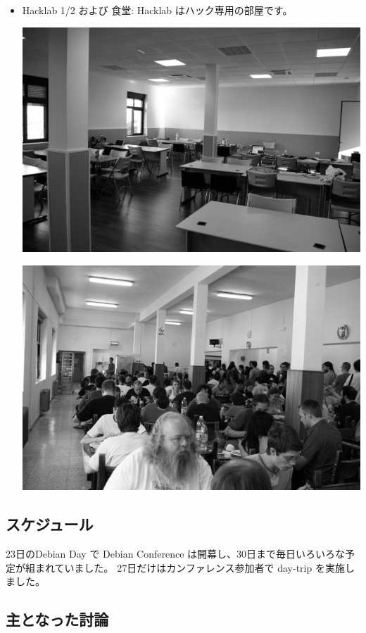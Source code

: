 \documentclass[mingoth,a4paper]{jsarticle}
\begin{document}
\begin{itemize}
  \item Hacklab 1/2 および 食堂: Hacklab はハック専用の部屋です。\\
	\begin{minipage}{0.4\hsize}
	\includegraphics[width=0.8\hsize]{image200908/debconf9_hacklab_mono.jpg}
	\end{minipage}
	\begin{minipage}{0.4\hsize}
	\includegraphics[width=0.8\hsize]{image200908/debconf9_diningroom_mono.jpg}
	\end{minipage}

\end{itemize} 

\subsection{スケジュール}

23日のDebian Day で Debian Conference は開幕し、30日まで毎日いろいろな予
定が組まれていました。
27日だけはカンファレンス参加者で day-trip を実施しました。

\subsection{主となった討論}
\end{document}
